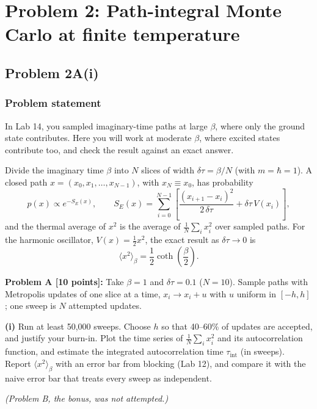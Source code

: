 \documentclass[11pt]{article}
\numberwithin{equation}{section}
\begin{document}
\section{Problem 2: Path-integral Monte Carlo at finite temperature}

\subsection{Problem 2A(i)}

\subsubsection*{Problem statement}
\begin{statement}
In Lab 14, you sampled imaginary-time paths at large $\beta$, where only the ground state contributes. Here you will work at moderate $\beta$, where excited states contribute too, and check the result against an exact answer.

Divide the imaginary time $\beta$ into $N$ slices of width $\delta\tau=\beta/N$ (with $m=\hbar=1$). A closed path $x=(x_0,x_1,\dots,x_{N-1})$, with $x_N\equiv x_0$, has probability
\begin{equation*}
p(x)\propto e^{-S_E(x)},\qquad S_E(x)=\sum_{i=0}^{N-1}\left[\frac{(x_{i+1}-x_i)^2}{2\,\delta\tau}+\delta\tau\,V(x_i)\right],\tag{4}
\end{equation*}
and the thermal average of $x^2$ is the average of $\frac1N\sum_ix_i^2$ over sampled paths. For the harmonic oscillator, $V(x)=\frac12x^2$, the exact result as $\delta\tau\to0$ is
\begin{equation*}
\langle x^2\rangle_\beta=\frac12\coth\!\left(\frac\beta2\right).\tag{5}
\end{equation*}

\textbf{Problem A [10 points]:} Take $\beta=1$ and $\delta\tau=0.1$ ($N=10$). Sample paths with Metropolis updates of one slice at a time, $x_i\to x_i+u$ with $u$ uniform in $[-h,h]$; one sweep is $N$ attempted updates.

\textbf{(i)} Run at least 50,000 sweeps. Choose $h$ so that 40--60\% of updates are accepted, and justify your burn-in. Plot the time series of $\frac1N\sum_ix_i^2$ and its autocorrelation function, and estimate the integrated autocorrelation time $\tau_\text{int}$ (in sweeps). Report $\langle x^2\rangle_\beta$ with an error bar from blocking (Lab 12), and compare it with the naive error bar that treats every sweep as independent.

\emph{(Problem B, the bonus, was not attempted.)}
\end{statement}
\end{document}
